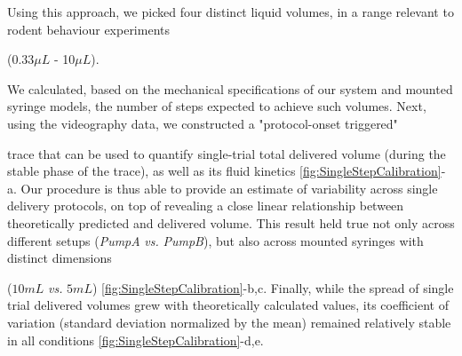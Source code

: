 Using this approach, we picked four distinct liquid volumes, in a range relevant to rodent behaviour experiments 


(0.33$\mu L$ - 10$\mu L$).



 We calculated, based on the mechanical specifications of our system and mounted syringe models, the number of steps expected to achieve such volumes. Next, using the videography data, we constructed a "protocol-onset triggered"


 trace that can be used to quantify single-trial total delivered volume (during the stable phase of the trace), as well as its fluid kinetics \ref{fig:SingleStepCalibration}-a. Our procedure is thus able to provide an estimate of variability across single delivery protocols, on top of revealing a close linear relationship between theoretically predicted and delivered volume. This result held true not only across different setups (\textit{PumpA} \textit{vs.} \textit{PumpB}), but also across mounted syringes with distinct dimensions 





($10mL$ \textit{vs.} $5mL$) \ref{fig:SingleStepCalibration}-b,c. Finally, while the spread of single trial delivered volumes grew with theoretically calculated values, its coefficient of variation (standard deviation normalized by the mean) remained relatively stable in all conditions \ref{fig:SingleStepCalibration}-d,e.


